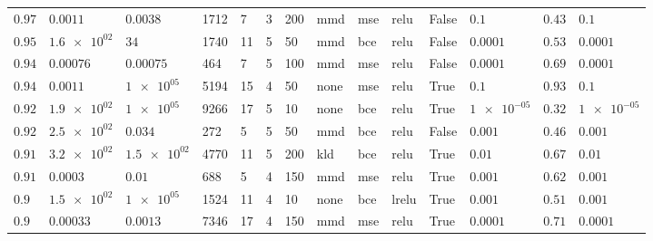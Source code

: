 \begin{landscape}
\begin{table}
\begin{tabular}{llllllllllllll}
$\num{ 0.97 }$ &  $\num{ 0.0011 }$ &  $\num{ 0.0038 }$ &         1712 &              7 &        3 &              200 &         mmd &                 mse &                relu &     False &    $\num{ 0.1 }$ & $\num{ 0.43 }$ &    $\num{ 0.1 }$ \\
$\num{ 0.95 }$ & $\num{ 1.6e+02 }$ &      $\num{ 34 }$ &         1740 &             11 &        5 &               50 &         mmd &                 bce &                relu &     False & $\num{ 0.0001 }$ & $\num{ 0.53 }$ & $\num{ 0.0001 }$ \\
$\num{ 0.94 }$ & $\num{ 0.00076 }$ & $\num{ 0.00075 }$ &          464 &              7 &        5 &              100 &         mmd &                 mse &                relu &     False & $\num{ 0.0001 }$ & $\num{ 0.69 }$ & $\num{ 0.0001 }$ \\
$\num{ 0.94 }$ &  $\num{ 0.0011 }$ &   $\num{ 1e+05 }$ &         5194 &             15 &        4 &               50 &        none &                 mse &                relu &      True &    $\num{ 0.1 }$ & $\num{ 0.93 }$ &    $\num{ 0.1 }$ \\
$\num{ 0.92 }$ & $\num{ 1.9e+02 }$ &   $\num{ 1e+05 }$ &         9266 &             17 &        5 &               10 &        none &                 bce &                relu &      True &  $\num{ 1e-05 }$ & $\num{ 0.32 }$ &  $\num{ 1e-05 }$ \\
$\num{ 0.92 }$ & $\num{ 2.5e+02 }$ &   $\num{ 0.034 }$ &          272 &              5 &        5 &               50 &         mmd &                 bce &                relu &     False &  $\num{ 0.001 }$ & $\num{ 0.46 }$ &  $\num{ 0.001 }$ \\
$\num{ 0.91 }$ & $\num{ 3.2e+02 }$ & $\num{ 1.5e+02 }$ &         4770 &             11 &        5 &              200 &         kld &                 bce &                relu &      True &   $\num{ 0.01 }$ & $\num{ 0.67 }$ &   $\num{ 0.01 }$ \\
$\num{ 0.91 }$ &  $\num{ 0.0003 }$ &    $\num{ 0.01 }$ &          688 &              5 &        4 &              150 &         mmd &                 mse &                relu &      True &  $\num{ 0.001 }$ & $\num{ 0.62 }$ &  $\num{ 0.001 }$ \\
 $\num{ 0.9 }$ & $\num{ 1.5e+02 }$ &   $\num{ 1e+05 }$ &         1524 &             11 &        4 &               10 &        none &                 bce &               lrelu &      True &  $\num{ 0.001 }$ & $\num{ 0.51 }$ &  $\num{ 0.001 }$ \\
 $\num{ 0.9 }$ & $\num{ 0.00033 }$ &  $\num{ 0.0013 }$ &         7346 &             17 &        4 &              150 &         mmd &                 mse &                relu &      True & $\num{ 0.0001 }$ & $\num{ 0.71 }$ & $\num{ 0.0001 }$ \\

\end{tabular}
\end{table}
\end{landscape}
